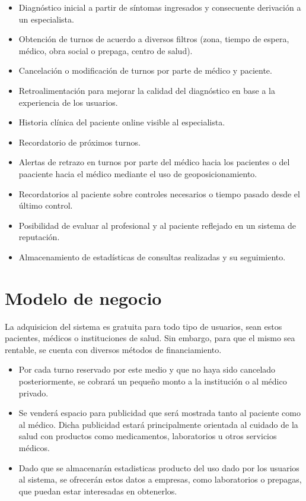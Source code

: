 \documentclass[a4paper,10pt]{article}
\begin{document}
\begin{itemize}
\item Diagnóstico inicial a partir de síntomas ingresados y consecuente derivación a un especialista.
\item Obtención de turnos de acuerdo a diversos filtros (zona, tiempo de espera, médico, obra social o prepaga, centro de salud).
\item Cancelación o modificación de turnos por parte de médico y paciente.
\item Retroalimentación para mejorar la calidad del diagnóstico en base a la experiencia de los usuarios.
\item Historia clínica del paciente online visible al especialista.
\item Recordatorio de próximos turnos.
\item Alertas de retrazo en turnos por parte del médico hacia los pacientes o del paaciente hacia el médico mediante el uso de geoposicionamiento.
\item Recordatorios al paciente sobre controles necesarios o tiempo pasado desde el último control.
\item Posibilidad de evaluar al profesional y al paciente reflejado en un sistema de reputación.
\item Almacenamiento de estadísticas de consultas realizadas y su seguimiento.
\end{itemize}

\section{Modelo de negocio}

La adquisicion del sistema es gratuita para todo tipo de usuarios, sean estos pacientes, médicos o instituciones de salud. Sin embargo, para que el mismo sea rentable, se cuenta con diversos métodos de financiamiento.

\begin{itemize}
\item Por cada turno reservado por este medio y que no haya sido cancelado posteriormente, se cobrará un pequeño monto a la institución o al médico privado.
\item Se venderá espacio para publicidad que será mostrada tanto al paciente como al médico. Dicha publicidad estará principalmente orientada al cuidado de la salud con productos como medicamentos, laboratorios u otros servicios médicos.
\item Dado que se almacenarán estadisticas producto del uso dado por los usuarios al sistema, se ofrecerán estos datos a empresas, como laboratorios o prepagas, que puedan estar interesadas en obtenerlos.
\end{itemize}
\end{document}
